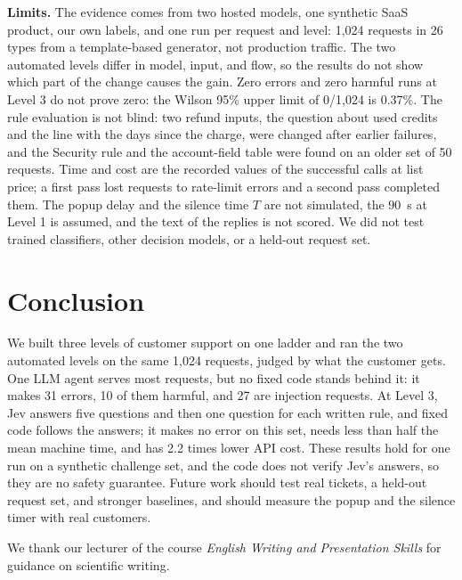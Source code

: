 \documentclass[sigconf,nonacm]{acmart}
\begin{document}
\textbf{Limits.} The evidence comes from two hosted models, one synthetic SaaS product, our own labels, and one run per request and level: 1,024 requests in 26 types from a template-based generator, not production traffic. The two automated levels differ in model, input, and flow, so the results do not show which part of the change causes the gain. Zero errors and zero harmful runs at Level 3 do not prove zero: the Wilson 95\% upper limit of 0/1,024 is 0.37\%. The rule evaluation is not blind: two refund inputs, the question about used credits and the line with the days since the charge, were changed after earlier failures, and the Security rule and the account-field table were found on an older set of 50 requests. Time and cost are the recorded values of the successful calls at list price; a first pass lost requests to rate-limit errors and a second pass completed them. The popup delay and the silence time \(T\) are not simulated, the 90~s at Level 1 is assumed, and the text of the replies is not scored. We did not test trained classifiers, other decision models, or a held-out request set.

\section{Conclusion}

We built three levels of customer support on one ladder and ran the two automated levels on the same 1,024 requests, judged by what the customer gets. One LLM agent serves most requests, but no fixed code stands behind it: it makes 31 errors, 10 of them harmful, and 27 are injection requests. At Level 3, Jev answers five questions and then one question for each written rule, and fixed code follows the answers; it makes no error on this set, needs less than half the mean machine time, and has 2.2 times lower API cost. These results hold for one run on a synthetic challenge set, and the code does not verify Jev's answers, so they are no safety guarantee. Future work should test real tickets, a held-out request set, and stronger baselines, and should measure the popup and the silence timer with real customers.

\begin{acks}
We thank our lecturer of the course \emph{English Writing and Presentation Skills} for guidance on scientific writing.
\end{acks}
\end{document}
